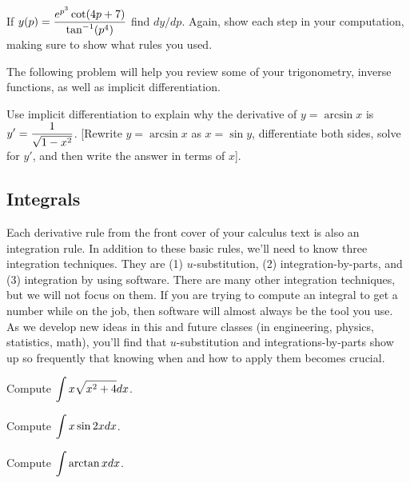 \begin{problem}
If $y(p) = \displaystyle \frac{e^{p^3}\cot(4p+7)}{\tan^{-1}(p^4)}$ find $dy/dp$. Again, show each step in your computation, making sure to show what rules you used.
\end{problem}

The following problem will help you review some of your trigonometry, inverse functions, as well as implicit differentiation.

\begin{problem}
Use implicit differentiation to explain why the derivative of $y=\arcsin x$ is $\displaystyle y'=\frac{1}{\sqrt{1-x^2}}$.  [Rewrite $y=\arcsin x$ as $x=\sin y$, differentiate both sides, solve for $y'$, and then write the answer in terms of $x$].  
\end{problem}


\subsection{Integrals}
Each derivative rule from the front cover of your calculus text is also an integration rule. In addition to these basic rules, we'll need to know three integration techniques.  They are 
(1) {$u$}-substitution,
(2) integration-by-parts, and
(3) integration by using software. 
There are many other integration techniques, but we will not focus on them. If you are trying to compute an integral to get a number while on the job, then software will almost always be the tool you use.  As we develop new ideas in this and future classes (in engineering, physics, statistics, math), you'll find that $u$-substitution and integrations-by-parts show up so frequently that knowing when and how to apply them becomes crucial.

\begin{problem}
Compute $\displaystyle\int x\sqrt{x^2+4}dx$.
\end{problem}

\begin{problem}
Compute $\displaystyle\int x\sin 2x dx$.
\end{problem}

\begin{problem}
Compute $\displaystyle \int \arctan x dx$.
\end{problem}


